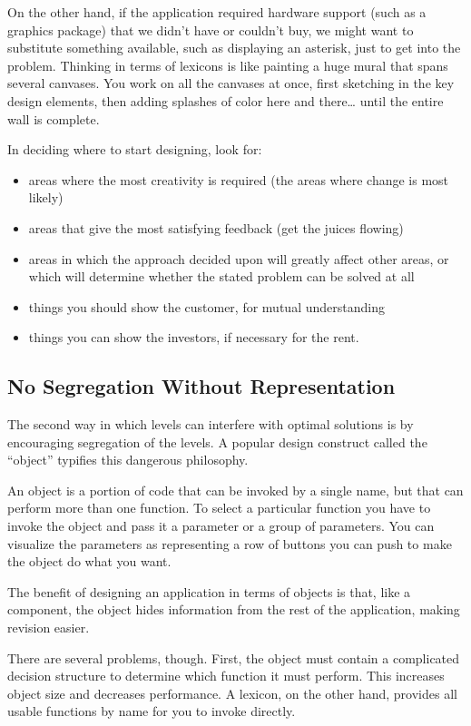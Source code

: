 On the other hand, if the application required hardware support (such as a
graphics package) that we didn't have or couldn't buy, we might want to
substitute something available, such as displaying an asterisk, just to
get into the problem. Thinking in terms of lexicons is like painting a
huge mural that spans several canvases. You work on all the canvases at
once, first sketching in the key design elements, then adding splashes of
color here and there\dots{} until the entire wall is complete.

\begin{tip}
In deciding where to start designing, look for:\medskip
\begin{itemize}
\item areas where the most creativity is required (the areas where change
is most likely)
\item areas that give the most satisfying feedback (get the juices
flowing)
\item areas in which the approach decided upon will greatly affect other
areas, or which will determine whether the stated problem can be solved at
all
\item things you should show the customer, for mutual understanding
\item things you can show the investors, if necessary for the rent.
\end{itemize}
\end{tip}

\subsection{No Segregation Without Representation}%
The second way in which levels can interfere with optimal solutions is by
encouraging segregation of the levels. A popular design construct called
the ``object'' typifies this dangerous philosophy.

An object is a portion of code that can be invoked by a single name,
but that can perform more than one function. To select a particular
function you have to invoke the object and pass it a parameter or a
group of parameters. You can visualize the parameters as representing
a row of buttons you can push to make the object do what you want.

The benefit of designing an application in terms of objects is that,
like a component, the object hides information from the rest of the
application, making revision easier.

There are several problems, though. First, the object must contain a
complicated decision structure to determine which function it must
perform. This increases object size and decreases performance. A
lexicon, on the other hand, provides all usable functions by name for
you to invoke directly.

